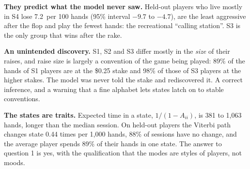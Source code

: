 \textbf{They predict what the model never saw.} Held-out players who live mostly in S4 lose 7.2\bb\ per 100 hands (95\% interval $-9.7$ to $-4.7$), are the least aggressive after the flop and play the fewest hands: the recreational ``calling station''. S3 is the only group that wins after the rake.

\textbf{An unintended discovery.} S1, S2 and S3 differ mostly in the \emph{size} of their raises, and raise size is largely a convention of the game being played: 89\% of the hands of S1 players are at the \$0.25 stake and 98\% of those of S3 players at the higher stakes. The model was never told the stake and rediscovered it. A correct inference, and a warning that a fine alphabet lets states latch on to stable conventions.

\textbf{The states are traits.} Expected time in a state, $1/(1-A_{ii})$, is 381 to 1{,}063 hands, longer than the median session. On held-out players the Viterbi path changes state 0.44 times per 1{,}000 hands, 88\% of sessions have no change, and the average player spends 89\% of their hands in one state. The answer to question 1 is yes, with the qualification that the modes are styles of players, not moods.
